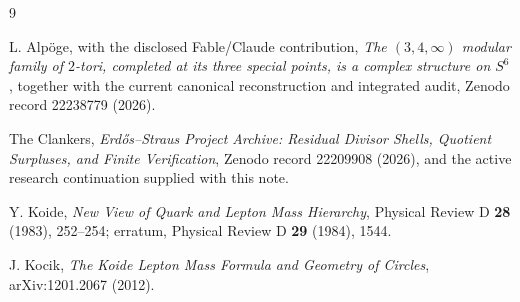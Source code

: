 \documentclass[11pt]{article}
\theoremstyle{definition}
\theoremstyle{remark}
\begin{document}
\begin{thebibliography}{9}

L. Alp\"oge, with the disclosed Fable/Claude contribution,
\emph{The $(3,4,\infty)$ modular family of $2$-tori, completed at its three
special points, is a complex structure on $S^6$}, together with the current
canonical reconstruction and integrated audit, Zenodo record 22238779 (2026).

The Clankers,
\emph{Erd\H{o}s--Straus Project Archive: Residual Divisor Shells, Quotient
Surpluses, and Finite Verification}, Zenodo record 22209908 (2026), and the
active research continuation supplied with this note.

Y. Koide,
\emph{New View of Quark and Lepton Mass Hierarchy},
Physical Review D \textbf{28} (1983), 252--254;
erratum, Physical Review D \textbf{29} (1984), 1544.

J. Kocik,
\emph{The Koide Lepton Mass Formula and Geometry of Circles},
arXiv:1201.2067 (2012).

\end{thebibliography}
\end{document}
